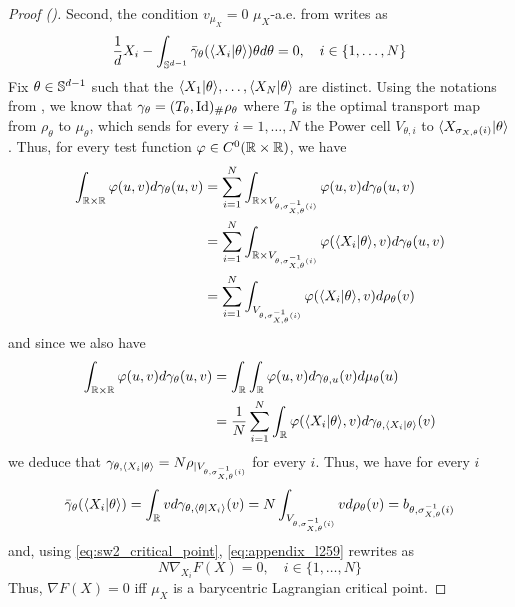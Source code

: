 \begin{proof}[Proof ()]
    Second, the condition $v_{\mu_X} = 0$ $\mu_X$-a.e. from  writes as
    \begin{equation} \label{eq:appendix_l259}
        \frac{1}{d} X_i - \int_{\mathbb S^{d-1}} \bar{\gamma}_\theta(\langle X_i|\theta\rangle) \theta d\theta = 0, \quad i \in \{1,\ldots,N\}
    \end{equation}
    Fix $\theta \in \mathbb S^{d-1}$ such that the $\langle X_1|\theta\rangle,\ldots,\langle X_N|\theta\rangle$ are distinct. Using the notations from , we know that $\gamma_\theta = (T_\theta,\mathop{\mathrm{Id}}\nolimits)_\#\rho_\theta$ where $T_\theta$ is the optimal transport map from $\rho_\theta$ to $\mu_\theta$, which sends for every $i=1,\ldots,N$ the Power cell $V_{\theta,i}$ to $\langle X_{\sigma_{X,\theta}(i)}|\theta\rangle$. Thus, for every test function $\varphi \in C^0(\mathbb R \times \mathbb R)$, we have
    \begin{align}
        \int_{\mathbb R \times \mathbb R} \varphi(u,v) d\gamma_\theta(u,v) &= \sum_{i=1}^N \int_{\mathbb R \times V_{\theta,\sigma^{-1}_{X,\theta}(i)}} \varphi(u,v) d\gamma_\theta(u,v) \\ 
        &= \sum_{i=1}^N \int_{\mathbb R \times V_{\theta,\sigma^{-1}_{X,\theta}(i)}} \varphi(\langle X_i|\theta\rangle,v) d\gamma_\theta(u,v) \\ 
        &= \sum_{i=1}^N \int_{V_{\theta,\sigma^{-1}_{X,\theta}(i)}} \varphi(\langle X_i|\theta\rangle,v) d\rho_\theta(v)
    \end{align}
    and since we also have
    \begin{align}
        \int_{\mathbb R \times \mathbb R} \varphi(u,v) d\gamma_\theta(u,v) &= \int_\mathbb R \int_\mathbb R \varphi(u,v) d\gamma_{\theta,u}(v) d\mu_\theta(u) \\
        &= \frac 1N \sum_{i=1}^N \int_{\mathbb R} \varphi(\langle X_i|\theta\rangle,v) d\gamma_{\theta,\langle X_i|\theta\rangle}(v)
    \end{align}
    we deduce that $\gamma_{\theta,\langle X_i|\theta\rangle} = N\rho_{|V_{\theta,\sigma^{-1}_{X,\theta}(i)}}$ for every $i$. Thus, we have for every $i$
    \begin{equation} \bar{\gamma}_\theta(\langle X_i|\theta\rangle) = \int_\mathbb R v d\gamma_{\theta,\langle\theta|X_i\rangle}(v) = N\int_{V_{\theta,\sigma^{-1}_{X,\theta}(i)}} vd\rho_\theta(v) = b_{\theta,\sigma_{X,\theta}^{-1}(i)} \end{equation}
    and, using \eqref{eq:sw2_critical_point}, \eqref{eq:appendix_l259} rewrites as
    \begin{equation} N\nabla_{X_i} F(X) = 0, \quad i \in \{1,\ldots,N\} \end{equation}
    Thus, $\nabla F(X) = 0$ iff $\mu_X$ is a barycentric Lagrangian critical point.
\end{proof}

